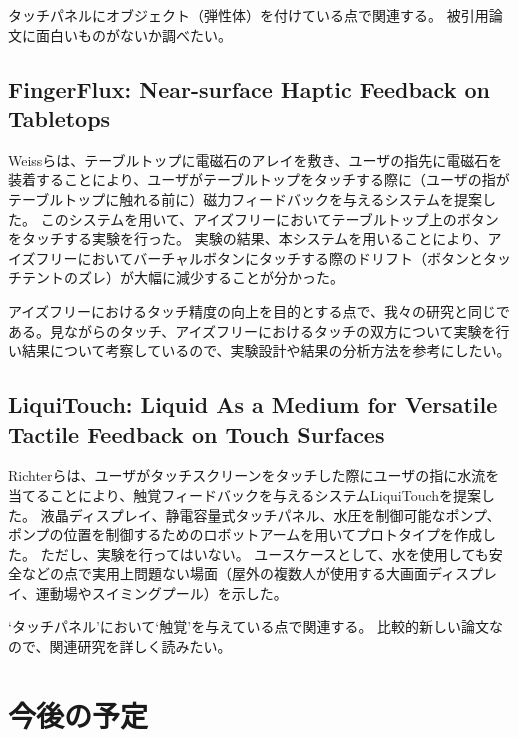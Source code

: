 \documentclass[11pt,a4paper]{jarticle}
\begin{document}
タッチパネルにオブジェクト（弾性体）を付けている点で関連する。
被引用論文に面白いものがないか調べたい。

\subsection{FingerFlux: Near-surface Haptic Feedback on Tabletops\cite{Weiss:2011}}
Weissらは、テーブルトップに電磁石のアレイを敷き、ユーザの指先に電磁石を装着することにより、ユーザがテーブルトップをタッチする際に（ユーザの指がテーブルトップに触れる前に）磁力フィードバックを与えるシステムを提案した。
このシステムを用いて、アイズフリーにおいてテーブルトップ上のボタンをタッチする実験を行った。
実験の結果、本システムを用いることにより、アイズフリーにおいてバーチャルボタンにタッチする際のドリフト（ボタンとタッチテントのズレ）が大幅に減少することが分かった。

アイズフリーにおけるタッチ精度の向上を目的とする点で、我々の研究と同じである。見ながらのタッチ、アイズフリーにおけるタッチの双方について実験を行い結果について考察しているので、実験設計や結果の分析方法を参考にしたい。

\subsection{LiquiTouch: Liquid As a Medium for Versatile Tactile Feedback on Touch Surfaces\cite{Richter:2013}}
Richterらは、ユーザがタッチスクリーンをタッチした際にユーザの指に水流を当てることにより、触覚フィードバックを与えるシステムLiquiTouchを提案した。
液晶ディスプレイ、静電容量式タッチパネル、水圧を制御可能なポンプ、ポンプの位置を制御するためのロボットアームを用いてプロトタイプを作成した。
ただし、実験を行ってはいない。
ユースケースとして、水を使用しても安全などの点で実用上問題ない場面（屋外の複数人が使用する大画面ディスプレイ、運動場やスイミングプール）を示した。

`タッチパネル'において`触覚'を与えている点で関連する。
比較的新しい論文なので、関連研究を詳しく読みたい。

\section{今後の予定}



\end{document}
